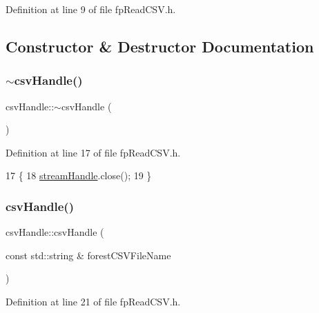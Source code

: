 Definition at line 9 of file fp\+Read\+C\+S\+V.\+h.



\subsection{Constructor \& Destructor Documentation}
\mbox{\label{classcsvHandle_add81ffc45990b6b8c1288a307581c1c8}} 
\subsubsection{\texorpdfstring{$\sim$csv\+Handle()}{~csvHandle()}}
{\footnotesize\ttfamily csv\+Handle\+::$\sim$csv\+Handle (\begin{DoxyParamCaption}{ }\end{DoxyParamCaption})\hspace{0.3cm}{\ttfamily [inline]}}



Definition at line 17 of file fp\+Read\+C\+S\+V.\+h.


\begin{DoxyCode}
17                     \{
18             \hyperlink{classcsvHandle_ab2900581db37409635ccfd878693fb48}{streamHandle}.close();
19         \}
\end{DoxyCode}
\mbox{\label{classcsvHandle_a8e4a197ecf07b72406c6c5125606f598}} 
\subsubsection{\texorpdfstring{csv\+Handle()}{csvHandle()}}
{\footnotesize\ttfamily csv\+Handle\+::csv\+Handle (\begin{DoxyParamCaption}\item[{const std\+::string \&}]{forest\+C\+S\+V\+File\+Name }\end{DoxyParamCaption})\hspace{0.3cm}{\ttfamily [inline]}}



Definition at line 21 of file fp\+Read\+C\+S\+V.\+h.


